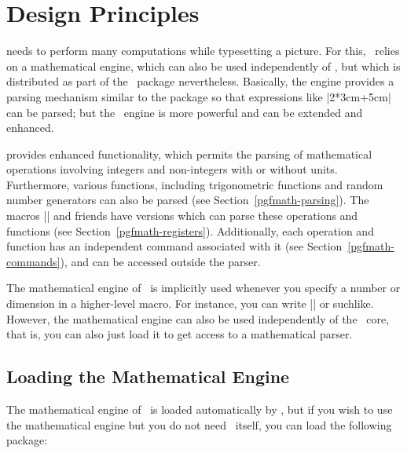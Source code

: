 %
%
%



\section{Design Principles}

\pgfname{} needs to perform many computations while typesetting a
picture. For this, \pgfname\ relies on a mathematical engine, which
can also be used independently of \pgfname, but which is distributed
as part of the \pgfname\ package nevertheless. Basically, the engine
provides a parsing mechanism similar to the \calcname{} package so
that expressions like |2*3cm+5cm| can be parsed; but the \pgfname\
engine is more powerful and can be extended and enhanced.

\pgfname{} provides enhanced functionality, which permits the parsing
of mathematical operations involving integers and non-integers
with or without units. Furthermore, various functions, including
trigonometric functions and random number generators can also be
parsed (see Section~\ref{pgfmath-parsing}).
The \calcname{} macros |\setlength| and friends have \pgfname{} versions
which can parse these operations and functions
(see Section~\ref{pgfmath-registers}). Additionally, each operation
and function has an independent \pgfname{} command associated with it
(see Section~\ref{pgfmath-commands}), and can be
accessed outside the parser.

The mathematical engine of \pgfname\ is implicitly used whenever you
specify a number or dimension in a higher-level macro. For instance,
you can write |\pgfpoint{2cm+4cm/2}{3cm*sin(30)}| or
suchlike. However, the mathematical engine can also be used
independently of the \pgfname\ core, that is, you can also just load
it to get access to a mathematical parser.


\subsection{Loading the Mathematical Engine}

The mathematical engine of \pgfname\ is loaded automatically by
\pgfname, but if you wish to use the mathematical engine but you do
not need \pgfname\ itself, you can load the following package:

